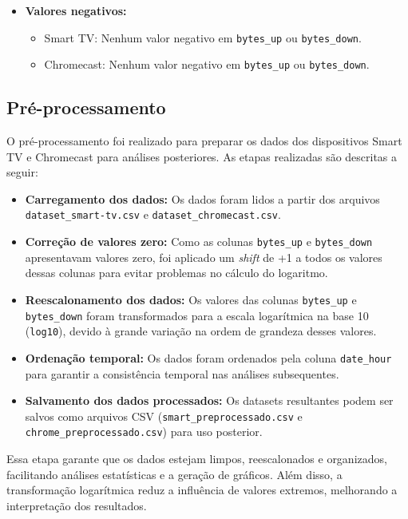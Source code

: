 \begin{itemize}
    \item \textbf{Valores negativos:}
    \begin{itemize}
        \item Smart TV: Nenhum valor negativo em \texttt{bytes\_up} ou \texttt{bytes\_down}.
        \item Chromecast: Nenhum valor negativo em \texttt{bytes\_up} ou \texttt{bytes\_down}.
    \end{itemize}
\end{itemize}


\subsection{Pré-processamento}

O pré-processamento foi realizado para preparar os dados dos dispositivos Smart TV e Chromecast para análises posteriores. As etapas realizadas são descritas a seguir:

\begin{itemize}
    \item \textbf{Carregamento dos dados:} Os dados foram lidos a partir dos arquivos \texttt{dataset\_smart-tv.csv} e \texttt{dataset\_chromecast.csv}.

    \item \textbf{Correção de valores zero:} Como as colunas \texttt{bytes\_up} e \texttt{bytes\_down} apresentavam valores zero, foi aplicado um \textit{shift} de +1 a todos os valores dessas colunas para evitar problemas no cálculo do logaritmo.

    \item \textbf{Reescalonamento dos dados:} Os valores das colunas \texttt{bytes\_up} e \texttt{bytes\_down} foram transformados para a escala logarítmica na base 10 (\texttt{log10}), devido à grande variação na ordem de grandeza desses valores.

    \item \textbf{Ordenação temporal:} Os dados foram ordenados pela coluna \texttt{date\_hour} para garantir a consistência temporal nas análises subsequentes.

    \item \textbf{Salvamento dos dados processados:} Os datasets resultantes podem ser salvos como arquivos CSV (\texttt{smart\_preprocessado.csv} e \texttt{chrome\_preprocessado.csv}) para uso posterior.
\end{itemize}

Essa etapa garante que os dados estejam limpos, reescalonados e organizados, facilitando análises estatísticas e a geração de gráficos. Além disso, a transformação logarítmica reduz a influência de valores extremos, melhorando a interpretação dos resultados. 
